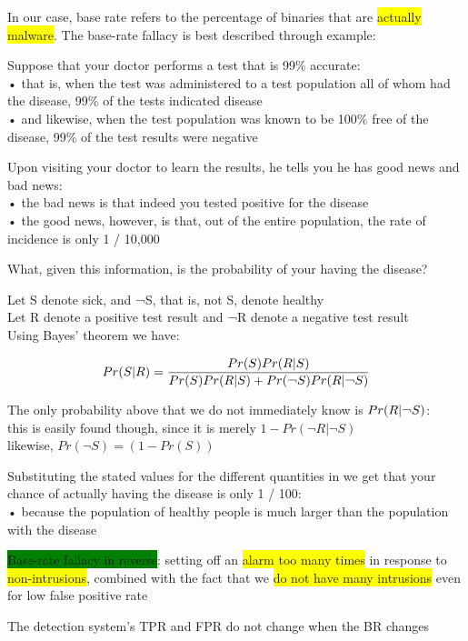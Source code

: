 \documentclass[]{project_plan}
\begin{document}
In our case, base rate refers to the percentage of binaries that are \colorbox{yellow}{actually malware}. The base-rate fallacy is best described through example:

Suppose that your doctor performs a test that is 99\% accurate:\\
• that is, when the test was administered to a test population all of whom had the disease, 99\% of the tests indicated disease\\
• and likewise, when the test population was known to be 100\% free of the disease, 99\% of the test results were negative

Upon visiting your doctor to learn the results, he tells you he has good news and bad news:\\
• the bad news is that indeed you tested positive for the disease\\
• the good news, however, is that, out of the entire population, the rate of incidence is only 1 / 10,000

What, given this information, is the probability of your having the disease?

Let S denote sick, and ¬S, that is, not S, denote healthy\\
Let R denote a positive test result and ¬R denote a negative test result\\
Using Bayes’ theorem we have:

\[
  Pr(S|R) = \frac{Pr(S) Pr(R|S)}{Pr(S) Pr(R|S) + Pr(\text{\textlnot}S) Pr(R|\text{\textlnot}S)}
\]

The only probability above that we do not immediately know is $Pr(R|\text{\textlnot}S)$:\\
this is easily found though, since it is merely $1 - Pr(\neg R|\neg S)$\\
likewise, $Pr(\neg S) = (1 - Pr(S))$

Substituting the stated values for the different quantities in we get that your chance of actually having the disease is only 1 / 100:\\
• because the population of healthy people is much larger than the population with the disease

\colorbox{green}{Base-rate fallacy in reverse}: setting off an \colorbox{yellow}{alarm too many times} in response to \colorbox{yellow}{non-intrusions}, combined with the fact that we \colorbox{yellow}{do not have many intrusions} even for low false positive rate

The detection system’s TPR and FPR do not change when the BR changes
\end{document}
